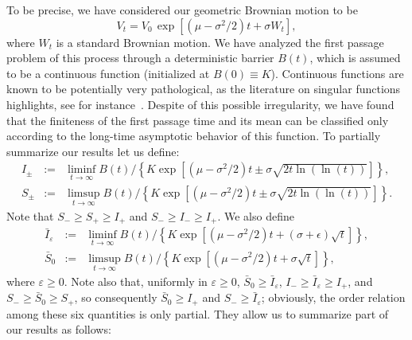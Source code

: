 \documentclass[12pt]{article}
\theoremstyle{definition}
\begin{document}
To be precise, we have considered our geometric Brownian motion to be
$$
V_t=V_0 \, \exp \left[(\mu-\sigma^2/2)t+\sigma W_t \right],
$$
where $W_t$ is a standard Brownian motion. We have analyzed the first passage problem of this process through a deterministic barrier $B(t)$, which is assumed to be a continuous function (initialized at $B(0) \equiv K$). Continuous functions are known to be potentially very pathological, as the literature on singular functions highlights, see for instance~\cite{Falconer2004,FernandezSanchez2012,Kawamura2011,ParadisViaderBibiloni2001}. Despite of this possible irregularity, we have found that the finiteness of the first passage time and its mean can be classified only according to the long-time asymptotic behavior of this function. To partially summarize our results let us define:
\begin{eqnarray}\nonumber
I_\pm &:=& \liminf_{t \to \infty} B(t) \Big/ \left\{ K \exp \left[(\mu-\sigma^2/2)t \pm \sigma \sqrt{2t \ln(\ln(t))}\right] \right\},
\\ \nonumber
S_\pm &:=& \limsup_{t \to \infty} B(t) \Big/ \left\{ K \exp \left[(\mu-\sigma^2/2)t \pm \sigma \sqrt{2t \ln(\ln(t))}\right] \right\}.
\end{eqnarray}
Note that $S_- \ge S_+ \ge I_+$ and $S_- \ge I_- \ge I_+$. We also define
\begin{eqnarray}\nonumber
\bar{I}_\varepsilon &:=& \liminf_{t \to \infty} B(t) \Big/ \left\{ K \exp \left[(\mu-\sigma^2/2)t + (\sigma+\epsilon)\sqrt{t}\right] \right\},
\\ \nonumber
\bar{S}_0 &:=& \limsup_{t \to \infty} B(t) \Big/ \left\{ K \exp \left[(\mu-\sigma^2/2)t + \sigma \sqrt{t}\right] \right\},
\end{eqnarray}
where $\varepsilon \ge 0$. Note also that, uniformly in $\varepsilon \ge 0$, $\bar{S}_0 \ge \bar{I}_\varepsilon$, $I_- \ge 
\bar{I}_\varepsilon \ge I_+$, and $S_- \ge 
\bar{S}_0 \ge S_+$, so consequently $\bar{S}_0 \ge I_+$ and $S_- \ge \bar{I}_\varepsilon$; obviously, the order relation among these six quantities is only partial. They allow us to summarize part of our results as follows:
\end{document}

